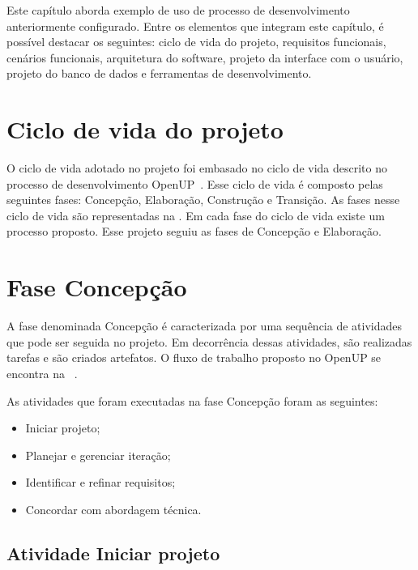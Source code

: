 Este capítulo aborda exemplo de uso de processo de desenvolvimento anteriormente configurado. Entre os elementos que integram este capítulo, é possível destacar os seguintes: ciclo de vida do projeto, requisitos funcionais, cenários funcionais, arquitetura do software, projeto da interface com o usuário, projeto do banco de dados e ferramentas de desenvolvimento.


\section{Ciclo de vida do projeto}
O ciclo de vida adotado no projeto foi embasado no ciclo de vida descrito no processo de desenvolvimento  OpenUP~\cite{openup}. Esse ciclo de vida é composto pelas seguintes fases: Concepção, Elaboração, Construção e Transição. As fases nesse ciclo de vida são representadas na . Em cada fase do ciclo de vida existe um processo proposto. Esse projeto seguiu as fases de Concepção e Elaboração.

%

\section{Fase Concepção}

A fase denominada Concepção é caracterizada por uma sequência de atividades que pode ser seguida no projeto. Em decorrência dessas atividades, são realizadas tarefas e são criados artefatos. O fluxo de trabalho proposto no OpenUP se encontra na ~.

%

As atividades que foram executadas na fase Concepção foram as seguintes:
\begin{itemize}
    \item Iniciar projeto;
    \item Planejar e gerenciar iteração;
    \item Identificar e refinar requisitos;
    \item Concordar com abordagem técnica.
\end{itemize}

\subsection{Atividade Iniciar projeto}

